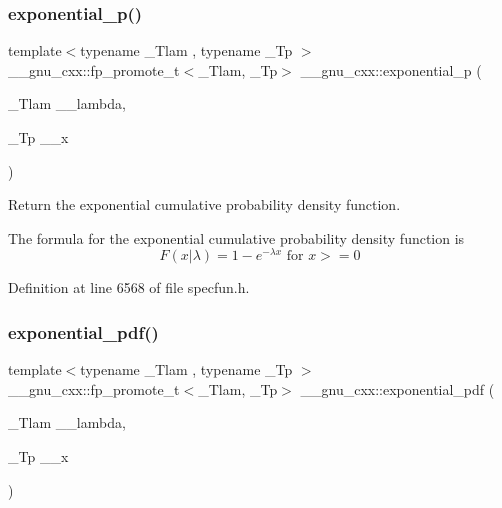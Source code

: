 \subsubsection{\texorpdfstring{exponential\+\_\+p()}{exponential\_p()}}
{\footnotesize\ttfamily template$<$typename \+\_\+\+Tlam , typename \+\_\+\+Tp $>$ \\
\+\_\+\+\_\+gnu\+\_\+cxx\+::fp\+\_\+promote\+\_\+t$<$\+\_\+\+Tlam, \+\_\+\+Tp$>$ \+\_\+\+\_\+gnu\+\_\+cxx\+::exponential\+\_\+p (\begin{DoxyParamCaption}\item[{\+\_\+\+Tlam}]{\+\_\+\+\_\+lambda,  }\item[{\+\_\+\+Tp}]{\+\_\+\+\_\+x }\end{DoxyParamCaption})\hspace{0.3cm}{\ttfamily [inline]}}



Return the exponential cumulative probability density function. 

The formula for the exponential cumulative probability density function is \[ F(x|\lambda) = 1 - e^{-\lambda x} \mbox{ for } x >= 0 \] 

Definition at line 6568 of file specfun.\+h.

\mbox{\label{group__gnu__math__spec__func_ga7f35499a94fd8930810809988332161e}} 
\subsubsection{\texorpdfstring{exponential\+\_\+pdf()}{exponential\_pdf()}}
{\footnotesize\ttfamily template$<$typename \+\_\+\+Tlam , typename \+\_\+\+Tp $>$ \\
\+\_\+\+\_\+gnu\+\_\+cxx\+::fp\+\_\+promote\+\_\+t$<$\+\_\+\+Tlam, \+\_\+\+Tp$>$ \+\_\+\+\_\+gnu\+\_\+cxx\+::exponential\+\_\+pdf (\begin{DoxyParamCaption}\item[{\+\_\+\+Tlam}]{\+\_\+\+\_\+lambda,  }\item[{\+\_\+\+Tp}]{\+\_\+\+\_\+x }\end{DoxyParamCaption})\hspace{0.3cm}{\ttfamily [inline]}}



